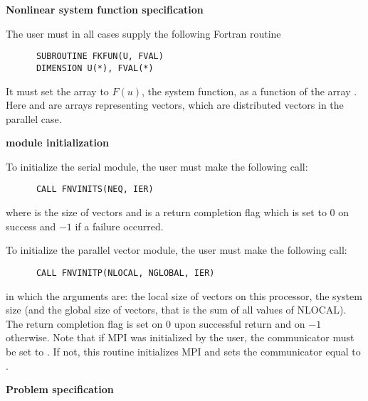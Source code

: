 \begin{Steps}
  
\item {\bf Nonlinear system function specification}
  
  The user must in all cases supply the following Fortran routine
\begin{verbatim}
      SUBROUTINE FKFUN(U, FVAL)
      DIMENSION U(*), FVAL(*)
\end{verbatim}
  It must set the  array to $F(u)$, the system function, as a
  function of the array . Here  and  are arrays representing
  vectors, which are distributed vectors in the parallel case.

\item  {\bf {\nvector} module initialization}

  {\s} To initialize the serial {\nvector} module, the user must make the
  following call:
\begin{verbatim}
      CALL FNVINITS(NEQ, IER)
\end{verbatim}
  where  is the size of vectors and
   is a  return completion flag which is set to $0$ on success and $-1$ 
  if a failure occurred.
  
  {\p} To initialize the parallel vector module, the user must make the
  following call:
\begin{verbatim}
      CALL FNVINITP(NLOCAL, NGLOBAL, IER)
\end{verbatim}
  in which the arguments are:  the local size of vectors on this
  processor,  the system size (and the global size of vectors, that
  is the sum of all values of NLOCAL). The return completion flag  is
  set on $0$ upon successful return and on $-1$ otherwise.
  Note that if MPI was initialized by the user, the communicator must be
  set to .  If not, this routine initializes MPI and sets
  the communicator equal to .

\item {\bf Problem specification}


\end{Steps}

